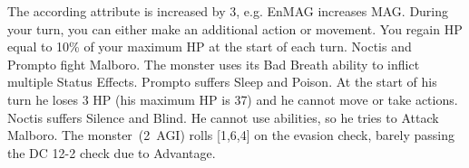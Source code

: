 %
 The according attribute is increased by 3, e.g. EnMAG increases MAG. \ofgap
%
 During your turn, you can either make an additional action or movement. \ofgap
%
 You regain HP equal to 10\% of your maximum HP at the start of each turn.
%
\vfill
%
{
	Noctis and Prompto fight Malboro. 
	The monster uses its Bad Breath ability to inflict multiple Status Effects.
	Prompto suffers Sleep and Poison.
	At the start of his turn he loses 3 HP (his maximum HP is 37) and he cannot move or take actions.
	Noctis suffers Silence and Blind.
	He cannot use abilities, so he tries to Attack Malboro. 
	The monster~(2~AGI) rolls [1,6,4] on the evasion check, barely passing the DC 12-2 check due to Advantage.
}
%
\clearpage
